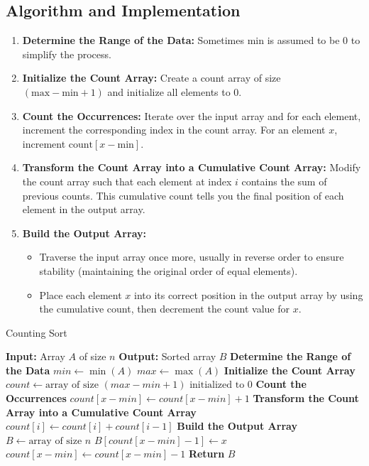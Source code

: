 \subsection{Algorithm and Implementation}
\begin{enumerate}
    \item \textbf{Determine the Range of the Data:} Sometimes min is assumed to be 0 to simplify the process.
    \item \textbf{Initialize the Count Array:} Create a count array of size \((\text{max} - \text{min} + 1)\) and initialize all elements to 0.
    \item \textbf{Count the Occurrences:} Iterate over the input array and for each element, increment the corresponding index in the count array. For an element \(x\), increment \(\text{count}[x - \text{min}]\).
    \item \textbf{Transform the Count Array into a Cumulative Count Array:} Modify the count array such that each element at index \(i\) contains the sum of previous counts. This cumulative count tells you the final position of each element in the output array.
    \item \textbf{Build the Output Array:}
    \begin{itemize}
        \item Traverse the input array once more, usually in reverse order to ensure stability (maintaining the original order of equal elements).
        \item Place each element \(x\) into its correct position in the output array by using the cumulative count, then decrement the count value for \(x\).
    \end{itemize}
\end{enumerate}

\begin{algorithm}
\caption{Counting Sort}
\begin{algorithmic}[1]
\State \textbf{Input:} Array $A$ of size $n$
\State \textbf{Output:} Sorted array $B$
\State \textbf{Determine the Range of the Data}
\State $min \gets \min(A)$
\State $max \gets \max(A)$
\State \textbf{Initialize the Count Array}
\State $count \gets \text{array of size } (max - min + 1) \text{ initialized to 0}$
\State \textbf{Count the Occurrences}
    \State $count[x - min] \gets count[x - min] + 1$
\EndFor
\State \textbf{Transform the Count Array into a Cumulative Count Array}
    \State $count[i] \gets count[i] + count[i - 1]$
\EndFor
\State \textbf{Build the Output Array}
\State $B \gets \text{array of size } n$
    \State $B[count[x - min] - 1] \gets x$
    \State $count[x - min] \gets count[x - min] - 1$
\EndFor
\State \textbf{Return} $B$
\end{algorithmic}
\end{algorithm}

